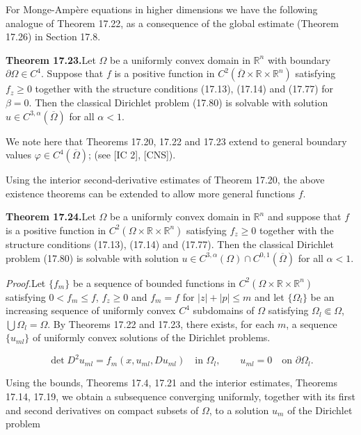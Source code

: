 For Monge-Ampère equations in higher dimensions we have the following
analogue of Theorem 17.22, as a consequence of the global estimate (Theorem
17.26) in Section 17.8.



\textbf{Theorem 17.23.}\quad Let $\Omega$ be a uniformly convex domain in $\mathbb{R}^n$ with boundary $\partial\Omega\in C^4$.
Suppose that $f$ is a positive function in $C^2(\overline{\Omega}\times\mathbb{R}\times\mathbb{R}^n)$ satisfying $f_z\geq 0$ together
with the structure conditions (17.13), (17.14) and (17.77) for $\beta=0$. Then the classical
Dirichlet problem (17.80) is solvable with solution $u\in C^{3,\alpha}(\overline{\Omega})$ for all $\alpha<1$.

\medskip

\noindent We note here that Theorems 17.20, 17.22 and 17.23 extend to general boundary
values $\varphi\in C^4(\overline{\Omega})$; (see [IC 2], [CNS]).

\medskip

Using the interior second-derivative estimates of Theorem 17.20, the above
existence theorems can be extended to allow more general functions $f$.

\medskip

\textbf{Theorem 17.24.}\quad Let $\Omega$ be a uniformly convex domain in $\mathbb{R}^n$ and suppose that $f$ is a
positive function in $C^2(\Omega\times\mathbb{R}\times\mathbb{R}^n)$ satisfying $f_z\geq 0$ together with the structure
conditions (17.13), (17.14) and (17.77). Then the classical Dirichlet problem (17.80) is
solvable with solution $u\in C^{3,\alpha}(\Omega)\cap C^{0,1}(\overline{\Omega})$ for all $\alpha<1$.

\medskip

\noindent\textit{Proof.}\quad Let $\{f_m\}$ be a sequence of bounded functions in $C^2(\Omega\times\mathbb{R}\times\mathbb{R}^n)$ satisfying
$0<f_m\leq f$, $f_z\geq 0$ and $f_m=f$ for $|z|+|p|\leq m$ and let $\{\Omega_l\}$ be an increasing
sequence of uniformly convex $C^4$ subdomains of $\Omega$ satisfying $\Omega_l\Subset\Omega$, $\bigcup \Omega_l=\Omega$.
By Theorems 17.22 and 17.23, there exists, for each $m$, a sequence $\{u_{ml}\}$ of uniformly
convex solutions of the Dirichlet problems.

\[
\det D^2u_{ml}=f_m(x,u_{ml},Du_{ml})\quad\text{in }\Omega_l,\qquad u_{ml}=0\quad\text{on }\partial\Omega_l.
\]

Using the bounds, Theorems 17.4, 17.21 and the interior estimates, Theorems 17.14,
17.19, we obtain a subsequence converging uniformly, together with its first and
second derivatives on compact subsets of $\Omega$, to a solution $u_m$ of the Dirichlet problem

